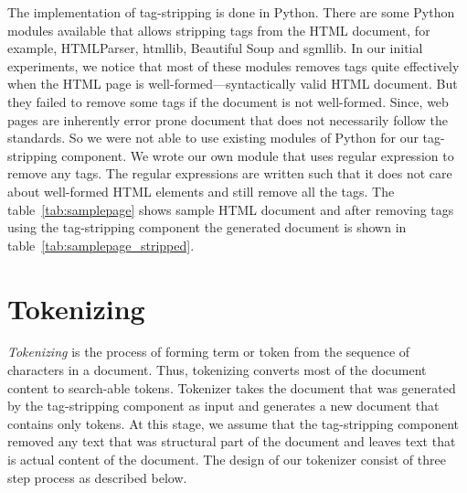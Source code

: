 \documentclass[letterpaper,11pt,twoside]{article}
\begin{document}
The implementation of tag-stripping is done in Python. There are some Python modules available that allows stripping tags from the HTML document, for example, HTMLParser, htmllib, Beautiful Soup and sgmllib. In our initial experiments, we notice that most of these modules removes tags quite effectively when the HTML page is well-formed---syntactically valid HTML document. But they failed to remove some tags if the document is not well-formed. Since, web pages are inherently error prone document that does not necessarily follow the standards. So we were not able to use existing modules of Python for our tag-stripping component. We wrote our own module that uses regular expression to remove any tags. The regular expressions are written such that it does not care about well-formed HTML elements and still remove all the tags. The table~\ref{tab:samplepage} shows sample HTML document and after removing tags using the tag-stripping component the generated document is shown in table~\ref{tab:samplepage_stripped}.

\section{Tokenizing}
\emph{Tokenizing} is the process of forming term or token from the sequence of characters in a document. Thus, tokenizing converts most of the document content to search-able tokens. Tokenizer takes the document that was generated by the tag-stripping component as input and generates a new document that contains only tokens. At this stage, we assume that the tag-stripping component removed any text that was structural part of the document and leaves text that is actual content of the document. The design of our tokenizer consist of three step process as described below.
\end{document}
